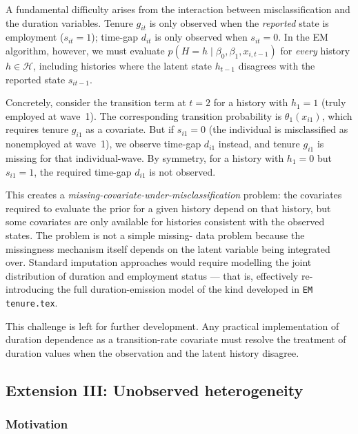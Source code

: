 A fundamental difficulty arises from the interaction between
misclassification and the duration variables. Tenure \(g_{it}\) is
only observed when the \emph{reported} state is employment
(\(s_{it} = 1\)); time-gap \(d_{it}\) is only observed when
\(s_{it} = 0\). In the EM algorithm, however, we must evaluate
\(p(H = h \mid \beta_0, \beta_1, x_{i,t-1})\) for \emph{every} history
\(h \in \mathcal{H}\), including histories where the latent state
\(h_{t-1}\) disagrees with the reported state \(s_{it-1}\).

Concretely, consider the transition term at \(t=2\) for a history with
\(h_1 = 1\) (truly employed at wave~1). The corresponding transition
probability is \(\theta_1(x_{i1})\), which requires tenure \(g_{i1}\)
as a covariate. But if \(s_{i1} = 0\) (the individual is misclassified
as nonemployed at wave~1), we observe time-gap \(d_{i1}\) instead,
and tenure \(g_{i1}\) is missing for that individual-wave. By
symmetry, for a history with \(h_1 = 0\) but \(s_{i1} = 1\), the
required time-gap \(d_{i1}\) is not observed.

This creates a \emph{missing-covariate-under-misclassification} problem:
the covariates required to evaluate the prior for a given history depend
on that history, but some covariates are only available for histories
consistent with the observed states. The problem is not a simple missing-
data problem because the missingness mechanism itself depends on the
latent variable being integrated over. Standard imputation approaches
would require modelling the joint distribution of duration and employment
status — that is, effectively re-introducing the full duration-emission
model of the kind developed in \texttt{EM tenure.tex}.

This challenge is left for further development. Any practical
implementation of duration dependence as a transition-rate covariate must
resolve the treatment of duration values when the observation and the
latent history disagree.

\subsection{Extension III: Unobserved heterogeneity}
\label{sec:fmm}

\subsubsection{Motivation}


